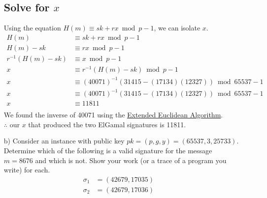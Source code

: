 \documentclass[12pt, letterpaper]{article}
\begin{document}
\begin{itemize}
\subsection{Solve for $x$}
Using the equation $H(m)\equiv sk + rx \bmod p-1$, we can isolate $x$.
\begin{equation*}
	\begin{split}
		H(m) & \equiv sk + rx \bmod p-1 \\
		H(m) - sk & \equiv rx \bmod p-1 \\
		r^{-1}(H(m) - sk) & \equiv x \bmod p-1 \\
		x & \equiv r^{-1}(H(m) - sk) \bmod p-1 \\
		x & \equiv (40071)^{-1} (31415 - (17134)(12327)) \bmod 65537 - 1\\
		x & \equiv (40071)^{-1} (31415 - (17134)(12327)) \bmod 65537 - 1\\
		x & \equiv 11811\\
	\end{split}
\end{equation*}
We found the inverse of 40071 using the \href{https://en.wikibooks.org/wiki/Algorithm_Implementation/Mathematics/Extended_Euclidean_algorithm#Iterative_algorithm_3}{Extended Euclidean Algorithm}.\newline \\ $\therefore$ our $x$ that produced the two ElGamal signatures is 11811.

\item[b)] Consider an instance with public key $pk = (p,g,y) = (65537, 3, 25733)$.  Determine which of the following is a valid signature for the message $m = 8676$ and which is not.  Show your work (or a trace of a program you write) for each.
\begin{align*}
\sigma_1 &= (42679, 17035) \quad \\ 
\sigma_2 &= (42679, 17036) \quad
\end{align*}


\end{itemize}
\end{document}
